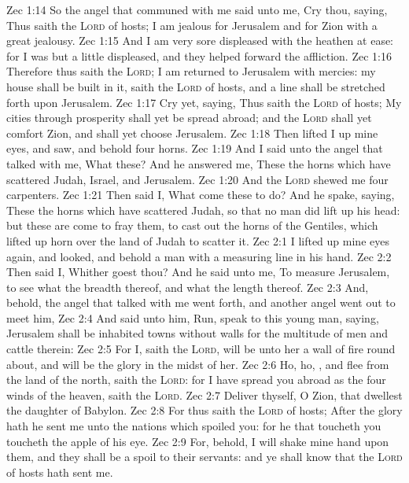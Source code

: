 \vs Zec 1:14 So the angel that communed with me said unto me, Cry thou, saying, Thus saith the \textsc{Lord} of hosts; I am jealous for Jerusalem and for Zion with a great jealousy.
\vs Zec 1:15 And I am very sore displeased with the heathen  at ease: for I was but a little displeased, and they helped forward the affliction.
\vs Zec 1:16 Therefore thus saith the \textsc{Lord}; I am returned to Jerusalem with mercies: my house shall be built in it, saith the \textsc{Lord} of hosts, and a line shall be stretched forth upon Jerusalem.
\vs Zec 1:17 Cry yet, saying, Thus saith the \textsc{Lord} of hosts; My cities through prosperity shall yet be spread abroad; and the \textsc{Lord} shall yet comfort Zion, and shall yet choose Jerusalem.
\vs Zec 1:18 Then lifted I up mine eyes, and saw, and behold four horns.
\vs Zec 1:19 And I said unto the angel that talked with me, What  these? And he answered me, These  the horns which have scattered Judah, Israel, and Jerusalem.
\vs Zec 1:20 And the \textsc{Lord} shewed me four carpenters.
\vs Zec 1:21 Then said I, What come these to do? And he spake, saying, These  the horns which have scattered Judah, so that no man did lift up his head: but these are come to fray them, to cast out the horns of the Gentiles, which lifted up  horn over the land of Judah to scatter it.
\vs Zec 2:1 I lifted up mine eyes again, and looked, and behold a man with a measuring line in his hand.
\vs Zec 2:2 Then said I, Whither goest thou? And he said unto me, To measure Jerusalem, to see what  the breadth thereof, and what  the length thereof.
\vs Zec 2:3 And, behold, the angel that talked with me went forth, and another angel went out to meet him,
\vs Zec 2:4 And said unto him, Run, speak to this young man, saying, Jerusalem shall be inhabited  towns without walls for the multitude of men and cattle therein:
\vs Zec 2:5 For I, saith the \textsc{Lord}, will be unto her a wall of fire round about, and will be the glory in the midst of her.
\vs Zec 2:6 Ho, ho, , and flee from the land of the north, saith the \textsc{Lord}: for I have spread you abroad as the four winds of the heaven, saith the \textsc{Lord}.
\vs Zec 2:7 Deliver thyself, O Zion, that dwellest  the daughter of Babylon.
\vs Zec 2:8 For thus saith the \textsc{Lord} of hosts; After the glory hath he sent me unto the nations which spoiled you: for he that toucheth you toucheth the apple of his eye.
\vs Zec 2:9 For, behold, I will shake mine hand upon them, and they shall be a spoil to their servants: and ye shall know that the \textsc{Lord} of hosts hath sent me.
